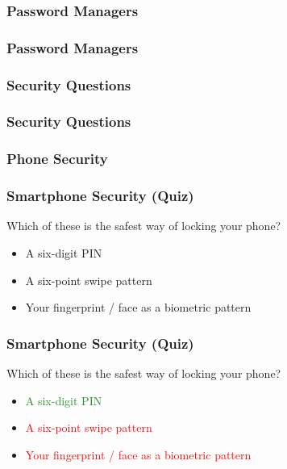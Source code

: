 \documentclass[aspectratio=169,dvipsnames]{beamer}
\begin{document}
\subsubsection{Password Managers}

\begin{frame}
\frametitle{Password Managers}
\end{frame}

\subsubsection{Security Questions}

\begin{frame}
\frametitle{Security Questions}
\end{frame}


\subsubsection{Phone Security}


\begin{frame}
\frametitle{Smartphone Security (Quiz)}

Which of these is the safest way of locking your phone?
\medskip

\begin{itemize}
\item A six-digit PIN
\item A six-point swipe pattern
\item Your fingerprint / face as a biometric pattern
\end{itemize}

\end{frame}

\begin{frame}
\frametitle{Smartphone Security (Quiz)}

Which of these is the safest way of locking your phone?
\medskip

\begin{itemize}
\item \textcolor{ForestGreen}{A six-digit PIN}
\item \textcolor{Red}{A six-point swipe pattern}
\item \textcolor{Red}{Your fingerprint / face as a biometric pattern}
\end{itemize}

\end{frame}
\end{document}
